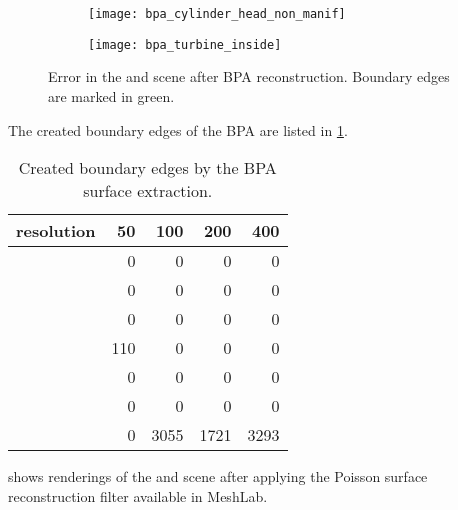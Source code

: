 \begin{figure}
	\centering
	\begin{subfigure}[b]{0.49\textwidth}
		\centering
		\texttt{[image: bpa\_cylinder\_head\_non\_manif]}
		\caption{}
		\label{fig:bpa_cylinder_head_non_manif}
	\end{subfigure}
	\begin{subfigure}[b]{0.49\textwidth}
		\centering
		\texttt{[image: bpa\_turbine\_inside]}
		\caption{}
		\label{fig:bpa_turbine_inside}
	\end{subfigure}
	\caption{
		Error in the \cylinderhead and \turbine scene after BPA reconstruction.
		Boundary edges are marked in green.
	}
	\label{fig:bpa_issues}
\end{figure}

The created boundary edges of the BPA are listed in \cref{tbl:bpa_boundary edges}.

\begin{table}
	\centering
	\begin{tabular}{l|r|r|r|r}
		resolution    &  50 &  100 &  200 &  400 \\
		\midrule
		\cubes        &   0 &    0 &    0 &    0 \\
		\cylindersd   &   0 &    0 &    0 &    0 \\
		\cylinders    &   0 &    0 &    0 &    0 \\
		\cylinderhead & 110 &    0 &    0 &    0 \\
		\impeller     &   0 &    0 &    0 &    0 \\
		\impellerhalf &   0 &    0 &    0 &    0 \\
		\turbine      &   0 & 3055 & 1721 & 3293 \\
	\end{tabular}
	\caption{
		Created boundary edges by the BPA surface extraction.
	}
	\label{tbl:bpa_boundary edges}
\end{table}

 shows renderings of the \cylinderhead and \impeller scene after applying the Poisson surface reconstruction filter available in MeshLab.

